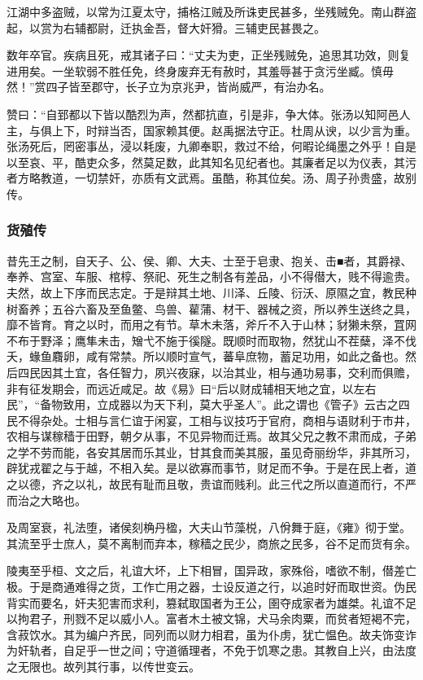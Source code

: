 \documentclass[]{article}
\begin{document}
江湖中多盗贼，以常为江夏太守，捕格江贼及所诛吏民甚多，坐残贼免。南山群盗起，以赏为右辅都尉，迁执金吾，督大奸猾。三辅吏民甚畏之。

数年卒官。疾病且死，戒其诸子曰：``丈夫为吏，正坐残贼免，追思其功效，则复进用矣。一坐软弱不胜任免，终身废弃无有赦时，其羞辱甚于贪污坐臧。慎毋然！''赏四子皆至郡守，长子立为京兆尹，皆尚威严，有治办名。

赞曰：``自郅都以下皆以酷烈为声，然都抗直，引是非，争大体。张汤以知阿邑人主，与俱上下，时辩当否，国家赖其便。赵禹据法守正。杜周从谀，以少言为重。张汤死后，罔密事丛，浸以耗废，九卿奉职，救过不给，何暇论绳墨之外乎！自是以至哀、平，酷吏众多，然莫足数，此其知名见纪者也。其廉者足以为仪表，其污者方略教道，一切禁奸，亦质有文武焉。虽酷，称其位矣。汤、周子孙贵盛，故别传。

\hypertarget{header-n6056}{%
\subsubsection{货殖传}\label{header-n6056}}

昔先王之制，自天子、公、侯、卿、大夫、士至于皂隶、抱关、击■者，其爵禄、奉养、宫室、车服、棺椁、祭祀、死生之制各有差品，小不得僣大，贱不得逾贵。夫然，故上下序而民志定。于是辩其土地、川泽、丘陵、衍沃、原隰之宜，教民种树畜养；五谷六畜及至鱼鳖、鸟兽、雚蒲、材干、器械之资，所以养生送终之具，靡不皆育。育之以时，而用之有节。草木未落，斧斤不入于山林；豺獭未祭，罝网不布于野泽；鹰隼未击，矰弋不施于徯隧。既顺时而取物，然犹山不茬蘖，泽不伐夭，蝝鱼麛卵，咸有常禁。所以顺时宣气，蕃阜庶物，蓄足功用，如此之备也。然后四民因其土宜，各任智力，夙兴夜寐，以治其业，相与通功易事，交利而俱赡，非有征发期会，而远近咸足。故《易》曰``后以财成辅相天地之宜，以左右民''，``备物致用，立成器以为天下利，莫大乎圣人''。此之谓也《管子》云古之四民不得杂处。士相与言仁谊于闲宴，工相与议技巧于官府，商相与语财利于市井，农相与谋稼穑于田野，朝夕从事，不见异物而迁焉。故其父兄之教不肃而成，子弟之学不劳而能，各安其居而乐其业，甘其食而美其服，虽见奇丽纷华，非其所习，辟犹戎翟之与于越，不相入矣。是以欲寡而事节，财足而不争。于是在民上者，道之以德，齐之以礼，故民有耻而且敬，贵谊而贱利。此三代之所以直道而行，不严而治之大略也。

及周室衰，礼法堕，诸侯刻桷丹楹，大夫山节藻棁，八佾舞于庭，《雍》彻于堂。其流至乎士庶人，莫不离制而弃本，稼穑之民少，商旅之民多，谷不足而货有余。

陵夷至乎桓、文之后，礼谊大坏，上下相冒，国异政，家殊俗，嗜欲不制，僣差亡极。于是商通难得之货，工作亡用之器，士设反道之行，以追时好而取世资。伪民背实而要名，奸夫犯害而求利，篡弑取国者为王公，圉夺成家者为雄桀。礼谊不足以拘君子，刑戮不足以威小人。富者木土被文锦，犬马余肉粟，而贫者短褐不完，含菽饮水。其为编户齐民，同列而以财力相君，虽为仆虏，犹亡愠色。故夫饰变诈为奸轨者，自足乎一世之间；守道循理者，不免于饥寒之患。其教自上兴，由法度之无限也。故列其行事，以传世变云。
\end{document}
